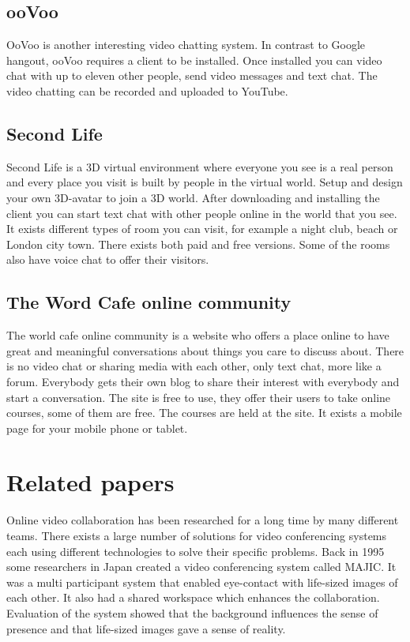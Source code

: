 \documentclass[12pt, titlepage]{article}
\begin{document}
\subsection{ooVoo}
OoVoo\cite{4} is another interesting video chatting system. In contrast to Google hangout, ooVoo requires a client to be installed. Once installed you can video chat with up to eleven other people, send video messages and text chat. The video chatting can be recorded and uploaded to YouTube.
\subsection{Second Life}
Second Life\cite{5} is a 3D virtual environment where everyone you see is a real person and every place you visit is built by people in the virtual world. Setup and design your own 3D-avatar to join a 3D world. After downloading and installing the client you can start text chat with other people online in the world that you see. It exists different types of room you can visit, for example a night club, beach or London city town. There exists both paid and free versions. Some of the rooms also have voice chat to offer their visitors.
\subsection{The Word Cafe online community}
The world cafe online community\cite{18} is a website who offers a place online to have great and meaningful conversations about things you care to discuss about. There is no video chat or sharing media with each other, only text chat, more like a forum. Everybody gets their own blog to share their interest with everybody and start a conversation. The site is free to use, they offer their users to take online courses, some of them are free. The courses are held at the site. It exists a mobile page for your mobile phone or tablet.

\section{Related papers}
Online video collaboration has been researched for a long time by many different teams. There exists a large number of solutions for video conferencing systems each using different technologies to solve their specific problems. Back in 1995 some researchers in Japan created a video conferencing system called MAJIC\cite{19}. It was a multi participant system that enabled eye-contact with life-sized images of each other. It also had a shared workspace which enhances the collaboration. Evaluation of the system showed that the background influences the sense of presence and that life-sized images gave a sense of reality.
\end{document}
